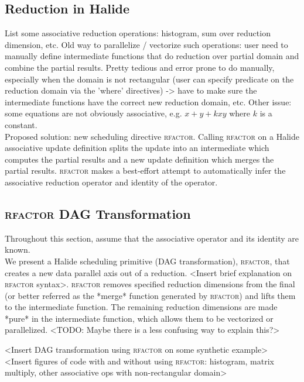 \subsection{Reduction in Halide}

List some associative reduction operations: histogram, sum over reduction dimension, etc. Old way to parallelize / vectorize such operations: user need to manually define intermediate functions that do reduction over partial domain and combine the partial results. Pretty tedious and error prone to do manually, especially when the domain is not rectangular (user can specify predicate on the reduction domain via the 'where' directives) -> have to make sure the intermediate functions have the correct new reduction domain, etc. Other issue: some equations are not obviously associative, e.g. $x + y + kxy$ where $k$ is a constant. \\

Proposed solution: new scheduling directive \textsc{rfactor}. Calling \textsc{rfactor} on a Halide associative update definition splits the update into an intermediate which computes the partial results and a new update definition which merges the partial results. \textsc{rfactor} makes a best-effort attempt to automatically infer the associative reduction operator and identity of the operator.

\subsection{\textsc{rfactor} DAG Transformation}

Throughout this section, assume that the associative operator and its identity are known. \\

We present a Halide scheduling primitive (DAG transformation), \textsc{rfactor}, that creates a new data parallel axis out of a reduction. <Insert brief explanation on \textsc{rfactor} syntax>. \textsc{rfactor} removes specified reduction dimensions from the final (or better referred as the *merge* function generated by \textsc{rfactor}) and lifts them to the intermediate function. The remaining reduction dimensions are made *pure* in the intermediate function, which allows them to be vectorized or parallelized. <TODO: Maybe there is a less confusing way to explain this?>

<Insert DAG transformation using \textsc{rfactor} on some synthetic example> \\

<Insert figures of code with and without using \textsc{rfactor}: histogram, matrix multiply, other associative ops with non-rectangular domain> \\

